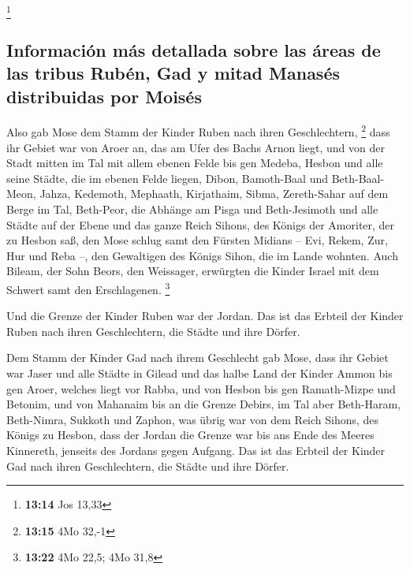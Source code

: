 \footnote{\textbf{13:14} Jos 13,33}

\hypertarget{informaciuxf3n-muxe1s-detallada-sobre-las-uxe1reas-de-las-tribus-rubuxe9n-gad-y-mitad-manasuxe9s-distribuidas-por-moisuxe9s}{%
\subsection{Información más detallada sobre las áreas de las tribus
Rubén, Gad y mitad Manasés distribuidas por
Moisés}\label{informaciuxf3n-muxe1s-detallada-sobre-las-uxe1reas-de-las-tribus-rubuxe9n-gad-y-mitad-manasuxe9s-distribuidas-por-moisuxe9s}}

 Also gab Mose dem Stamm der Kinder Ruben nach ihren
Geschlechtern, \footnote{\textbf{13:15} 4Mo 32,-1}  dass
ihr Gebiet war von Aroer an, das am Ufer des Bachs Arnon liegt, und von
der Stadt mitten im Tal mit allem ebenen Felde bis gen Medeba,
 Hesbon und alle seine Städte, die im ebenen Felde
liegen, Dibon, Bamoth-Baal und Beth-Baal-Meon,  Jahza,
Kedemoth, Mephaath,  Kirjathaim, Sibma, Zereth-Sahar auf
dem Berge im Tal,  Beth-Peor, die Abhänge am Pisga und
Beth-Jesimoth  und alle Städte auf der Ebene und das
ganze Reich Sihons, des Königs der Amoriter, der zu Hesbon saß, den Mose
schlug samt den Fürsten Midians -- Evi, Rekem, Zur, Hur und Reba --, den
Gewaltigen des Königs Sihon, die im Lande wohnten.  Auch
Bileam, der Sohn Beors, den Weissager, erwürgten die Kinder Israel mit
dem Schwert samt den Erschlagenen. \footnote{\textbf{13:22} 4Mo 22,5;
  4Mo 31,8}

 Und die Grenze der Kinder Ruben war der Jordan. Das ist
das Erbteil der Kinder Ruben nach ihren Geschlechtern, die Städte und
ihre Dörfer.

 Dem Stamm der Kinder Gad nach ihrem Geschlecht gab Mose,
 dass ihr Gebiet war Jaser und alle Städte in Gilead und
das halbe Land der Kinder Ammon bis gen Aroer, welches liegt vor Rabba,
 und von Hesbon bis gen Ramath-Mizpe und Betonim, und von
Mahanaim bis an die Grenze Debirs,  im Tal aber
Beth-Haram, Beth-Nimra, Sukkoth und Zaphon, was übrig war von dem Reich
Sihons, des Königs zu Hesbon, dass der Jordan die Grenze war bis ans
Ende des Meeres Kinnereth, jenseits des Jordans gegen Aufgang.
 Das ist das Erbteil der Kinder Gad nach ihren
Geschlechtern, die Städte und ihre Dörfer.

